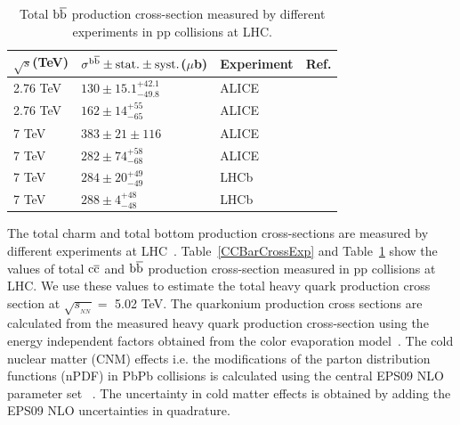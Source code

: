 \documentclass[12pt,a4paper,final]{iopart} %
\newcommand{\sNN}{\sqrt{s_{_{NN}}}}
\newcommand{\ccbar}{\rm{c\overline{c}}}
\newcommand{\bbbar}{\rm{b\overline{b}}}
\begin{document}
\begin{table}[t]
\caption[]{Total $\bbbar$ production cross-section measured by different experiments in pp collisions at LHC.}
\label{BBBarCrossExp}
\begin{tabular}{l|l|l|l} 
\hline 
\hline
  $\sqrt{s}$(TeV)           &$\sigma^{\bbbar}\pm {\rm stat.}\pm {\rm syst.}$($\mu$b)            &Experiment      &Ref.  \\              
\hline
 2.76 TeV                   &$130\pm15.1^{+42.1}_{-49.8}$           & ALICE     &\cite{Abelev:2014hla}               \\
 2.76 TeV                   &$162\pm14^{+55}_{-65}$                & ALICE     &\cite{Abelev:2012sca}               \\
 7 TeV                      &$383\pm21\pm116$                   & ALICE     &\cite{Abelev:2012sca}               \\
 7 TeV                      &$282\pm74^{+58}_{-68}$               & ALICE     &\cite{Abelev:2012gx}               \\
 7 TeV                      &$284\pm20^{+49}_{-49}$              & LHCb     &\cite{Aaij:2010gn}               \\
 7 TeV                      &$288\pm4^{+48}_{-48}$              & LHCb     &\cite{Aaij:2011jh}               \\
\hline
\hline
\end{tabular}
\end{table}




The total charm and total bottom production cross-sections are measured by different experiments at 
LHC~\cite{Abelev:2012vra,Adam:2016ich,ATLAS:2011fea,Aad:2015zix,LHCb:2010lga,Abelev:2014hla,Abelev:2012sca,Abelev:2012gx,Aaij:2010gn,Aaij:2011jh}. 
Table~\ref{CCBarCrossExp} and Table~\ref{BBBarCrossExp} show the values of total $\ccbar$ 
and $\bbbar$ production cross-section measured in pp collisions at LHC.
We use these values to estimate the 
total heavy quark production cross section at $\sNN =$ 5.02 TeV.
The quarkonium production cross sections are calculated from the measured heavy 
quark production cross-section using the energy independent factors obtained
from the color evaporation model~\cite{Kumar:2014kfa,Nelson:2012bc,Vogt:2012vr}.
The cold nuclear matter (CNM) effects i.e. the modifications of the parton distribution
functions (nPDF) in PbPb collisions is calculated using the central EPS09 NLO
parameter set~\cite{Eskola:2009uj} .
The uncertainty in cold matter effects is obtained by adding the EPS09 NLO uncertainties in quadrature.
\end{document}
